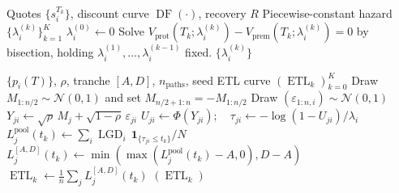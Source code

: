 \documentclass[11pt,a4paper]{article}
\newcommand{\1}{\mathbf{1}}
\newcommand{\Nor}{\mathcal{N}}
\DeclareMathOperator{\LGD}{LGD}
\DeclareMathOperator{\ETL}{ETL}
\DeclareMathOperator{\DF}{DF}
\begin{document}
\begin{algorithm}[H]
\caption{ISDA-consistent piecewise-constant hazard bootstrap.}
\begin{algorithmic}[1]
\Require Quotes $\{s_i^{T_k}\}$, discount curve $\DF(\cdot)$, recovery $R$
\Ensure  Piecewise-constant hazard $\{\lambda_i^{(k)}\}_{k=1}^{K}$
  \State $\lambda_i^{(0)} \gets 0$
    \State Solve $V_{\text{prot}}(T_k;\lambda_i^{(k)})-V_{\text{prem}}(T_k;\lambda_i^{(k)}) = 0$
    \Statex \hspace{1.2em} by bisection, holding $\lambda_i^{(1)},\dots,\lambda_i^{(k-1)}$ fixed.
  \EndFor
\EndFor
\State \Return $\{\lambda_i^{(k)}\}$
\end{algorithmic}
\end{algorithm}

\begin{algorithm}[H]
\caption{Monte-Carlo tranche ETL with antithetic variates.}
\begin{algorithmic}[1]
\Require  $\{p_i(T)\}$, $\rho$, tranche $[A,D]$, $n_{\text{paths}}$, seed
\Ensure   ETL curve $(\ETL_k)_{k=0}^{K}$
\State Draw $M_{1:n/2}\sim\Nor(0,1)$ and set $M_{n/2+1:n}=-M_{1:n/2}$
\State Draw $(\varepsilon_{1:n,i})\sim\Nor(0,1)$
\State $Y_{ji}\gets\sqrt{\rho}\,M_j+\sqrt{1-\rho}\,\varepsilon_{ji}$
\State $U_{ji}\gets\Phi(Y_{ji});\quad \tau_{ji}\gets -\log(1-U_{ji})/\lambda_i$
  \State $L_j^{\text{pool}}(t_k)\gets\sum_i \LGD_i\,\1_{\{\tau_{ji}\le t_k\}}/N$
  \State $L_j^{[A,D]}(t_k)\gets\min(\max(L_j^{\text{pool}}(t_k)-A,0),D-A)$
  \State $\ETL_k\gets\frac{1}{n}\sum_j L_j^{[A,D]}(t_k)$
\EndFor
\State \Return $(\ETL_k)$
\end{algorithmic}
\end{algorithm}
\end{document}
